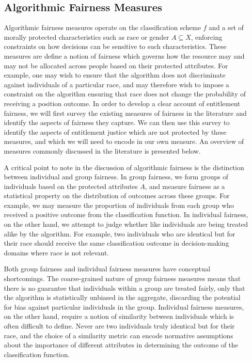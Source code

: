 \subsection{Algorithmic Fairness Measures}\label{sec:fairness-measures}

Algorithmic fairness measures operate on the classification scheme $f$ and a set
of morally protected characteristics such as race or gender $A \subseteq X$,
enforcing constraints on how decisions can be sensitive to such characteristics.
These measures are define a notion of fairness which governs how the resource
may and may not be allocated across people based on their protected attributes.
For example, one may wish to ensure that the algorithm does not discriminate
against individuals of a particular race, and may therefore wish to impose a
constraint on the algorithm ensuring that race does not change the probability
of receiving a position outcome. In order to develop a clear account of
entitlement fairness, we will first survey the existing measures of fairness in
the literature and identify the aspects of fairness they capture. We can then
use this survey to identify the aspects of entitlement justice which are not
protected by these measures, and which we will need to encode in our own
measure. An overview of measures commonly discussed in the literature is
presented below.

A critical point to note in the discussion of algorithmic fairness is the 
distinction between individual and group fairness. In group fairness, we form
groups of individuals based on the protected attributes $A$, and measure
fairness as a statistical property on the distribution of outcomes across these
groups. For example, we may measure the proportion of individuals from each
group who received a positive outcome from the classification function. In
individual fairness, on the other hand, we attempt to judge whether like
individuals are being treated alike by the algorithm. For example, two
individuals who are identical but for their race should receive the same
classification outcome in decision-making domains where race is not relevant. 

Both group fairness and individual fairness measures have conceptual
shortcomings. The coarse-grained nature of group fairness measures means that
there is no guarantee that individuals within a group are treated fairly, only
that the algorithm is statistically unbiased in the aggregate, discarding
the potential for bias against particular individuals in the group. Individual
fairness measures, on the other hand, require a notion of similarity between
individuals which is often difficult to define. Never are two individuals
truly identical but for their race, and the choice of a similarity metric can
encode normative assumptions about the importance of different attributes in
determining the outcome of the classification function.

